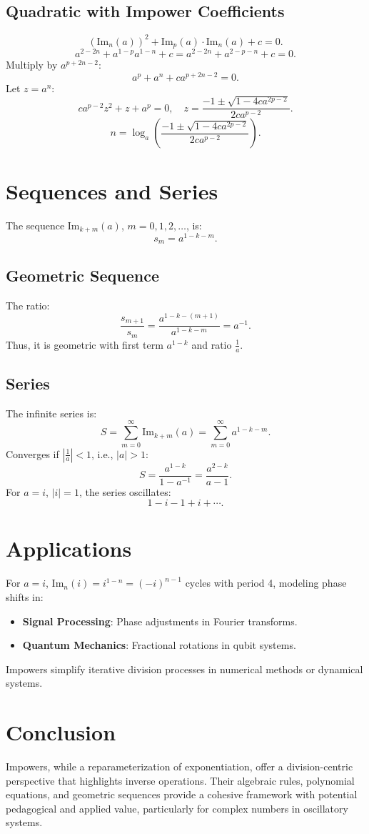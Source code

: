 \documentclass{article}
\begin{document}
\subsection{Quadratic with Impower Coefficients}
\[
(\text{Im}_n(a))^2 + \text{Im}_p(a) \cdot \text{Im}_n(a) + c = 0.
\]
\[
a^{2-2n} + a^{1-p} a^{1-n} + c = a^{2-2n} + a^{2-p-n} + c = 0.
\]
Multiply by \(a^{p+2n-2}\):
\[
a^p + a^n + c a^{p+2n-2} = 0.
\]
Let \(z = a^n\):
\[
c a^{p-2} z^2 + z + a^p = 0, \quad z = \frac{-1 \pm \sqrt{1 - 4 c a^{2p-2}}}{2 c a^{p-2}}.
\]
\[
n = \log_a \left( \frac{-1 \pm \sqrt{1 - 4 c a^{2p-2}}}{2 c a^{p-2}} \right).
\]

\section{Sequences and Series}
The sequence \(\text{Im}_{k+m}(a)\), \(m = 0, 1, 2, \dots\), is:
\[
s_m = a^{1-k-m}.
\]
\subsection{Geometric Sequence}
The ratio:
\[
\frac{s_{m+1}}{s_m} = \frac{a^{1-k-(m+1)}}{a^{1-k-m}} = a^{-1}.
\]
Thus, it is geometric with first term \(a^{1-k}\) and ratio \(\frac{1}{a}\).

\subsection{Series}
The infinite series is:
\[
S = \sum_{m=0}^\infty \text{Im}_{k+m}(a) = \sum_{m=0}^\infty a^{1-k-m}.
\]
Converges if \(\left| \frac{1}{a} \right| < 1\), i.e., \(|a| > 1\):
\[
S = \frac{a^{1-k}}{1 - a^{-1}} = \frac{a^{2-k}}{a - 1}.
\]
For \(a = i\), \(|i| = 1\), the series oscillates:
\[
1 - i - 1 + i + \cdots.
\]

\section{Applications}
For \(a = i\), \(\text{Im}_n(i) = i^{1-n} = (-i)^{n-1}\) cycles with period 4, modeling phase shifts in:
\begin{itemize}
    \item \textbf{Signal Processing}: Phase adjustments in Fourier transforms.
    \item \textbf{Quantum Mechanics}: Fractional rotations in qubit systems.
\end{itemize}
Impowers simplify iterative division processes in numerical methods or dynamical systems.

\section{Conclusion}
Impowers, while a reparameterization of exponentiation, offer a division-centric perspective that highlights inverse operations. Their algebraic rules, polynomial equations, and geometric sequences provide a cohesive framework with potential pedagogical and applied value, particularly for complex numbers in oscillatory systems.
\end{document}
